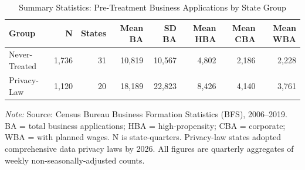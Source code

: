 \begin{table}[!h]
\centering
\caption{\label{tab:tab:summary}Summary Statistics: Pre-Treatment Business Applications by State Group}
\small
\begin{tabular}[t]{lrrrrrrr}
\toprule
Group & N & States & Mean BA & SD BA & Mean HBA & Mean CBA & Mean WBA\\
\midrule
Never-Treated & 1,736 & 31 & 10,819 & 10,567 & 4,802 & 2,186 & 2,228\\
Privacy-Law & 1,120 & 20 & 18,189 & 22,823 & 8,426 & 4,140 & 3,761\\
\bottomrule
\end{tabular}

\vspace{0.3em}
{\footnotesize \textit{Note:} Source: Census Bureau Business Formation Statistics (BFS), 2006--2019. BA = total business applications; HBA = high-propensity; CBA = corporate; WBA = with planned wages. N is state-quarters. Privacy-law states adopted comprehensive data privacy laws by 2026. All figures are quarterly aggregates of weekly non-seasonally-adjusted counts.}
\end{table}
